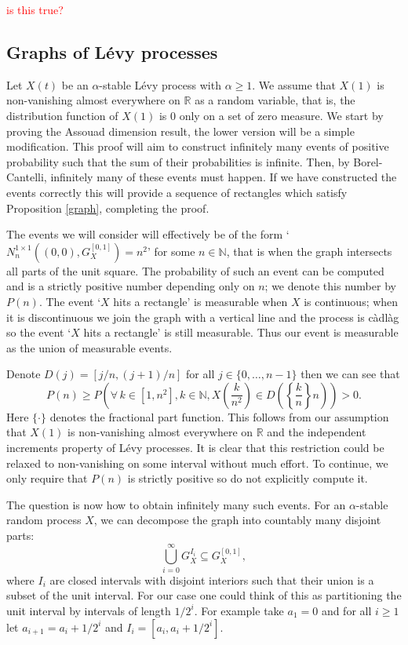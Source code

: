\textcolor{red}{is this true?}


\subsection{Graphs of L\'evy processes}\label{LP}

Let $X(t)$ be an $\alpha$-stable L\'evy process with $\alpha \ge 1$. We assume that $X(1)$ is non-vanishing almost everywhere on $\mathbb{R}$ as a random variable, that is, the distribution function of $X(1)$ is 0 only on a set of zero measure. We start by proving the Assouad dimension result, the lower version will be a simple modification. This proof will aim to construct infinitely many events of positive probability such that the sum of their probabilities is infinite. Then, by Borel-Cantelli, infinitely many of these events must happen. If we have constructed the events correctly this will provide a sequence of rectangles which satisfy Proposition \ref{graph}, completing the proof.

The events we will consider will effectively be of the form `$N_{n}^{1 \times 1 }((0,0),G_X^{[0,1]})=n^2$' for some $n\in \mathbb{N}$, that is when the graph intersects all parts of the unit square. The probability of such an event can be computed and is a strictly positive number depending only on $n$; we denote this number by $P(n)$. The event `$X$ hits a rectangle' is measurable when $X$ is continuous; when it is discontinuous we join the graph with a vertical line and the process is c\`adl\`ag so the event `$X$ hits a rectangle' is still measurable. Thus our event is measurable as the union of measurable events. 

Denote $D(j)=[j/n,(j+1)/n]$ for all $j\in\{0,\dots, n-1\}$ then we can see that
\[
P(n)\geq P\left(\forall \, k\in\left[1,n^2\right], k\in \mathbb{N},X\left(\frac{k}{n^2}\right)\in D\left(\left\{\frac{k}{n}\right\}n\right)\right)>0.
\]
Here $\{ \cdot \}$ denotes the fractional part function. This follows from our assumption that $X(1)$ is non-vanishing almost everywhere on $\mathbb{R}$ and the independent increments property of L\'evy processes. It is clear that this restriction could be relaxed to non-vanishing on some interval without much effort. To continue, we only require that $P(n)$ is strictly positive so do not explicitly compute it.


The question is now how to obtain infinitely many such events. For an $\alpha$-stable random process $X$, we can decompose the graph into countably many disjoint parts:
\[
\bigcup_{i=0}^\infty G_X^{I_i}\subseteq G_X^{[0,1]},
\]
where $I_i$ are closed intervals with disjoint interiors such that their union is a subset of the unit interval. For our case one could think of this as partitioning the unit interval by intervals of length $1/2^i$. For example take $a_1=0$ and for all $i\geq 1$ let $a_{i+1}=a_i+1/2^i$ and $I_i=[a_i,a_i+1/2^{i}].$

